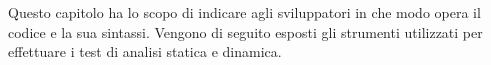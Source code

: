 \documentclass[../manuale_sviluppatore.tex]{subfiles}
\begin{document}
Questo capitolo ha lo scopo di indicare agli sviluppatori in che modo opera il codice e la sua sintassi. 
Vengono di seguito esposti gli strumenti utilizzati per effettuare i test di analisi statica e dinamica.
\end{document}
